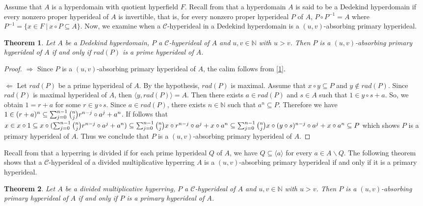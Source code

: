 \documentclass[preprint,review,10pt]{amsart}
\newtheorem{theorem}{Theorem}[section]
\theoremstyle{definition}
\theoremstyle{remark}
\numberwithin{equation}{section}
\begin{document}
Assume that $A$ is  a hyperdomain with quotient hyperﬁeld $F$. Recall from \cite{Ghiasvand2} that a hyperdomain
 $A$ is said to be a Dedekind hyperdomain if every nonzero proper hyperideal of $A$ is invertible, that is, for every nonzero proper hyperideal $P$ of $A$, $P\circ P^{-1}=A$ where $P^{-1}=\{x \in F \ \vert \ x \circ P \subseteq  A\}$. Now, we examine  when a $\mathcal{C}$-hyperideal in  a Dedekind hyperdomain is  a $(u,v)$-absorbing primary hyperideal.
\begin{theorem}
Let $A$ be a Dedekind hyperdomain, $P$ a $\mathcal{C}$-hyperideal of $A$ and  $u,v \in \mathbb{N}$ with $u >v$. Then $P$ is a $(u,v)$-absorbing primary hyperideal of $A$ if and only if $rad(P)$ is a prime hyperideal of $A$.
\end{theorem}
\begin{proof}
$\Longrightarrow$ Since $P$ is a $(u,v)$-absorbing primary hyperideal of $A$, the calim follows from \ref{1}.

$\Longleftarrow$ Let $rad(P)$ be a prime hyperideal of $A$. By the hypothesis, $rad(P)$ is maximal. Assume that $x \circ y \subseteq P$ and $y \notin rad(P)$. Since $rad(P)$ is maximal hyperideal of $A$, then $\langle y, rad(P) \rangle=A$. Then there exists $a \in rad(P)$ and $s \in A$ such that $1 \in y \circ s +a$. So, we obtain $1=r+a$ for some  $r \in y \circ s$. Since $a \in rad(P)$, there exists $n \in \mathbb{N}$ such that $a^n \subseteq P$. Therefore we have $1 \in (r+a)^n \subseteq \sum_{j=0}^{n-1} \tbinom{n}{j}r^{n-j}\circ a^j+  a^n$.  If follows that $x \in x \circ 1 \subseteq x \circ (\sum_{j=0}^{n-1} \tbinom{n}{j}r^{n-j}\circ a^j+a^n )\subseteq \sum_{j=0}^{n-1} \tbinom{n}{j} x \circ r^{n-j}\circ a^j+x \circ a^n \subseteq \sum_{j=0}^{n-1} \tbinom{n}{j} x \circ (y\circ s)^{n-j}\circ a^j+x \circ a^n \subseteq P$ which shows $P$ is a primary hyperideal of $A$. Thus we conclude that $P$ is a $(u,v)$-absorbing primary hyperideal of $A$.
\end{proof}
Recall from \cite{Ghiasvand2} that a hyperring is divided if for each prime  hyperideal $Q$ of $A$, we have $Q \subseteq \langle a \rangle$ for every $a \in A\backslash Q$. The following theorem shows that a $\mathcal{C}$-hyperideal of a divided multiplicative hyperring $A$ is a $(u,v)$-absorbing primary hyperideal  if and only if it is a primary hyperideal.
\begin{theorem}
Let $A$ be a divided multiplicative hyperring, $P$ a $\mathcal{C}$-hyperideal of $A$ and  $u,v \in \mathbb{N}$ with $u >v$. Then $P$ is a $(u,v)$-absorbing primary hyperideal of $A$ if and only if $P$ is a primary hyperideal of $A$.
\end{theorem}
\end{document}
